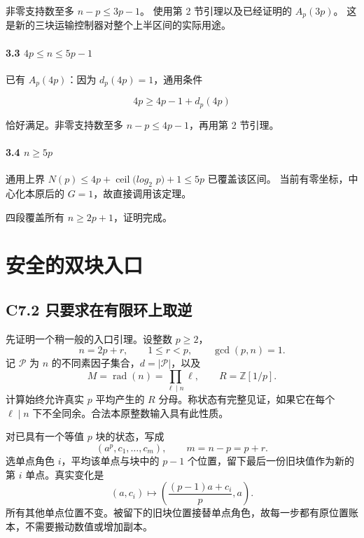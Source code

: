 \documentclass[11pt,a4paper]{article}
\theoremstyle{definition}
\numberwithin{equation}{section}
\begin{document}
{非零支持数至多} {\ensuremath{n-p\le 3p-1}。} {使用第} {2} {节引理以及已经证明的} {\ensuremath{A_{p}(3p)}。} {这是新的三块运输控制器对整个上半区间的实际用途。}

\paragraph*{\texorpdfstring{{3.3} {\ensuremath{4p\le n\le 5p-1}}}{3.3 }}\label{C6-h38}

{已有} {\ensuremath{A_{p}(4p)}：因为} {\ensuremath{d_{p}(4p)=1}，通用条件}

\[
4p\ge4p-1+d_p(4p)
\]

{恰好满足。非零支持数至多} {\ensuremath{n-p\le 4p-1}，再用第} {2} {节引理。}

\paragraph*{\texorpdfstring{{3.4} {\ensuremath{n\ge 5p}}}{3.4 }}\label{C6-h39}

{通用上界} {\ensuremath{N(p)\le 4p+\operatorname{ceil}(log_{2}}} {\ensuremath{p)+1\le 5p}} {已覆盖该区间。} {当前有零坐标，中心化本原后的} {\ensuremath{G=1}，故直接调用该定理。}

{四段覆盖所有} {\ensuremath{n\ge 2p+1}，证明完成。}


\section{安全的双块入口}\label{construct:entry}
\subsection*{\texorpdfstring{{C7.2} {只要求在有限环上取逆}}{C7.2 只要求在有限环上取逆}}\label{C7-h40}

{先证明一个稍一般的入口引理。设整数} \(p\ge2\){，} \[
n=2p+r,\qquad1\le r<p,\qquad\gcd(p,n)=1.
\] {记} \(\mathcal P\) {为} \(n\) {的不同素因子集合，}\(d=|\mathcal P|\){，以及} \[
M=\operatorname{rad}(n)=\prod_{\ell\mid n}\ell,\qquad R=\mathbb Z[1/p].
\] {计算始终允许真实} \(p\) {平均产生的} \(R\) {分母。称状态有完整见证，如果它在每个} \(\ell\mid n\) {下不全同余。合法本原整数输入具有此性质。}

{对已具有一个等值} \(p\) {块的状态，写成} \[
(a^p,c_1,\ldots,c_m),\qquad m=n-p=p+r.
\] {选单点角色} \(i\){，平均该单点与块中的} \(p-1\) {个位置，留下最后一份旧块值作为新的第} \(i\) {单点。真实变化是} \[
(a,c_i)\longmapsto\left(\frac{(p-1)a+c_i}{p},a\right).\tag{C7.2}
\] {所有其他单点位置不变。被留下的旧块位置接替单点角色，故每一步都有原位置账本，不需要搬动数值或增加副本。}
\end{document}

